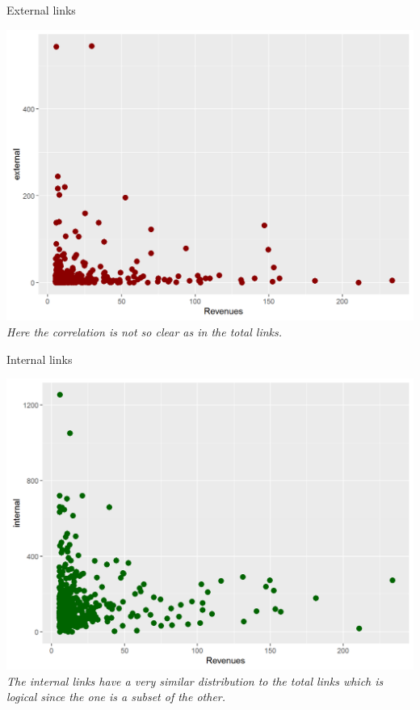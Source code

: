 \documentclass{book}
\begin{document}
\begin{table}[H]
\centering
\caption{External links}
\begin{center}
\includegraphics[scale=0.5]{../R/photos/26_ext_rev.png}  \\
\textit{Here the correlation is not so clear as in the total links.}
\end{center}
\end{table}

\begin{table}[H]
\centering
\caption{Internal links}
\begin{center}
\includegraphics[scale=0.5]{../R/photos/28_int_rev.png}  \\
\textit{The internal links have a very similar distribution to the total links which is logical since the one is a subset of the other.}
\end{center}
\end{table}
\end{document}
